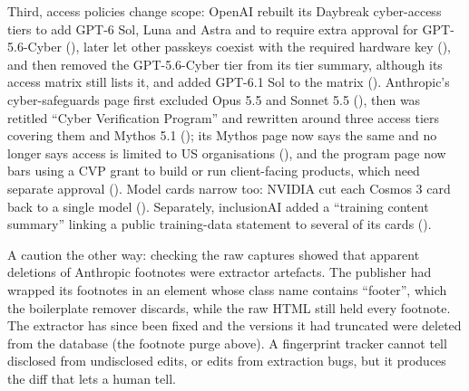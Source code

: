 \documentclass[10pt,a4paper]{article}
\begin{document}
Third,
access policies change scope: OpenAI rebuilt its Daybreak cyber-access tiers to add GPT-6 Sol, Luna and Astra and to
require extra approval for GPT-5.6-Cyber (\exDaybreakTiers), later let other passkeys coexist with the required
hardware key (\exDaybreakKeys), and then removed the GPT-5.6-Cyber tier from its tier summary, although its access matrix still lists it,
and added GPT-6.1 Sol to the matrix (\exDaybreakCyberTier). Anthropic's cyber-safeguards page first excluded Opus 5.5 and Sonnet 5.5 (\exCyberScope),
then was retitled ``Cyber Verification Program'' and rewritten around three access tiers covering them and Mythos 5.1
(\exCvpRewrite); its Mythos page now says the same and no longer says access is limited to US organisations (\exCvpExpand), and the
program page now bars using a CVP grant to build or run client-facing products, which need separate approval (\exCvpClient). Model cards narrow too: NVIDIA cut each Cosmos 3 card back to a single model
(\exCosmos). Separately, inclusionAI added a ``training content summary'' linking a public training-data statement
to several of its cards (\exTrainingSummary).

A caution the other way: checking the raw captures showed that apparent deletions of
Anthropic footnotes were extractor artefacts. The publisher had wrapped its footnotes in an element whose class
name contains ``footer'', which the boilerplate remover discards, while the raw HTML still held every
footnote. The extractor has since been fixed and the versions it had truncated were deleted from the database
(the footnote purge above).\extractorArtefactSentence{} A fingerprint tracker cannot tell disclosed from
undisclosed edits, or edits from extraction bugs, but it produces the diff that lets a human tell.

\begin{table}[!htb]
\centering\scriptsize

\caption{Publisher-side changes selected by rule from Appendix~\ref{app:changes} (edits the classifier described as undisclosed, dated
corrections, pages whose content moved behind an HTTP 200, licence changes, then the largest major edit),
one row per distinct change, capped per kind. Summaries are the classifier's; URLs and version ids are in
Appendix~\ref{app:changes}.}
\label{tab:notable}
\end{table}
\end{document}
